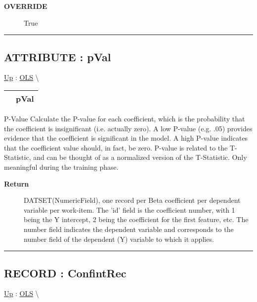 \par

\par
\begin{description}
\item [\textbf{OVERRIDE}] True
\end{description}

\rule{\linewidth}{0.5pt}


\subsection*{ATTRIBUTE : pVal}
\hypertarget{ecldoc:linearregression.ols.pval}{}
\hyperlink{ecldoc:linearregression.ols}{Up} :
\hspace{0pt} \hyperlink{ecldoc:linearregression.ols}{OLS} \textbackslash 

{\renewcommand{\arraystretch}{1.5}
\begin{tabularx}{\textwidth}{|>{\raggedright\arraybackslash}l|X|}
\hline
\hspace{0pt} & pVal \\
\hline
\end{tabularx}
}

\par
P-Value Calculate the P-value for each coefficient, which is the probability that the coefficient is insignificant (i.e. actually zero). A low P-value (e.g. .05) provides evidence that the coefficient is significant in the model. A high P-value indicates that the coefficient value should, in fact, be zero. P-value is related to the T-Statistic, and can be thought of as a normalized version of the T-Statistic. Only meaningful during the training phase.

\par
\begin{description}
\item [\textbf{Return}] DATSET(NumericField), one record per Beta coefficient per dependent variable per work-item. The 'id' field is the coefficient number, with 1 being the Y intercept, 2 being the coefficient for the first feature, etc. The number field indicates the dependent variable and corresponds to the number field of the dependent (Y) variable to which it applies.
\end{description}

\rule{\linewidth}{0.5pt}
\subsection*{RECORD : ConfintRec}
\hypertarget{ecldoc:linearregression.ols.confintrec}{}
\hyperlink{ecldoc:linearregression.ols}{Up} :
\hspace{0pt} \hyperlink{ecldoc:linearregression.ols}{OLS} \textbackslash 

